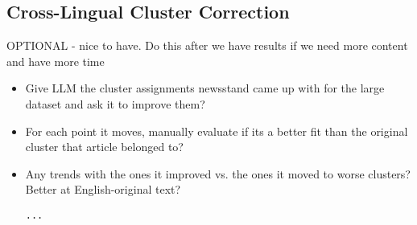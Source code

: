 \subsection{Cross-Lingual Cluster Correction}
OPTIONAL - nice to have. Do this after we have results if we need more content and have more time
\begin{itemize}
    \item Give LLM the cluster assignments newsstand came up with for the large dataset and ask it to improve them? 
    \item For each point it moves, manually evaluate if its a better fit than the original cluster that article belonged to?
    \item Any trends with the ones it improved vs. the ones it moved to worse clusters? Better at English-original text?
    \begin{lstlisting}[title=Prompt 8: Cluster Correction Prompt]
    ...
    \end{lstlisting}
\end{itemize}

